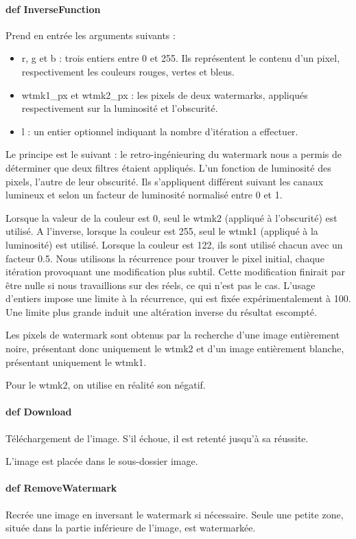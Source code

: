 \documentclass[a4paper,12pt]{article}
\begin{document}
\paragraph{def InverseFunction}
Prend en entrée les arguments suivants :
\begin{itemize}
\item r, g et b : trois entiers entre 0 et 255. Ils représentent le contenu d'un pixel, respectivement les couleurs rouges, vertes et bleus.
\item wtmk1\_px et wtmk2\_px : les pixels de deux watermarks, appliqués respectivement sur la luminosité et l'obscurité.
\item l : un entier optionnel indiquant la nombre d'itération a effectuer.
\end{itemize}
Le principe est le suivant : le retro-ingénieuring du watermark nous a permis de déterminer que deux filtres étaient appliqués. L'un fonction de luminosité des pixels, l'autre de leur obscurité. Ils s'appliquent différent suivant les canaux lumineux et selon un facteur de luminosité normalisé entre 0 et 1.

Lorsque la valeur de la couleur est 0, seul le wtmk2 (appliqué à l'obscurité) est utilisé. A l'inverse, lorsque la couleur est 255, seul le wtmk1 (appliqué à la luminosité) est utilisé. Lorsque la couleur est 122, ils sont utilisé chacun avec un facteur 0.5. 
Nous utilisons la récurrence pour trouver le pixel initial, chaque itération provoquant une modification plus subtil. Cette modification finirait par être nulle si nous travaillions sur des réels, ce qui n'est pas le cas. L'usage d'entiers impose une limite à la récurrence, qui est fixée expérimentalement à 100. Une limite plus grande induit une altération inverse du résultat escompté. 

Les pixels de watermark sont obtenus par la recherche d'une image entièrement noire, présentant donc uniquement le wtmk2 et d'un image entièrement blanche, présentant uniquement le wtmk1. 

Pour le wtmk2, on utilise en réalité son négatif.
\paragraph{def Download}
Téléchargement de l'image. S'il échoue, il est retenté jusqu'à sa réussite.

L'image est placée dans le sous-dossier image.
\paragraph{def RemoveWatermark}
Recrée une image en inversant le watermark si nécessaire. Seule une petite zone, située dans la partie inférieure de l'image, est watermarkée.
\end{document}
